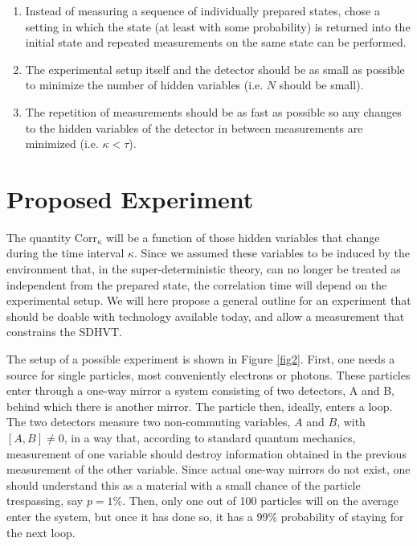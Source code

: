 \documentclass[12pt]{article}                    %
\begin{document}
\begin{enumerate}
\item Instead of measuring a sequence of individually prepared states, chose a setting
in which the state (at least with some probability) is returned into the initial state
and repeated measurements on the same state can be performed. 
\item The experimental setup itself and the detector should be as small as
possible to minimize the number of hidden variables (i.e. $N$ should be small). 
\item The repetition of measurements should be as fast as possible so any
changes to the hidden variables of the detector in between measurements are minimized (i.e. $\kappa < \tau$).
\end{enumerate}

\section{Proposed Experiment}

The quantity ${\mathrm{Corr}}_\kappa$ will be a function of those hidden 
variables that change during the time interval $\kappa$. Since we assumed
these variables to be induced by the environment that, in the super-deterministic
theory, can no longer be treated as independent from the prepared state,
the correlation time will depend on the experimental setup. We will here
propose a general outline for an experiment that should be doable with
technology available today, and allow a measurement that constrains 
the {\sc SDHVT}.

The setup of a possible experiment is shown in Figure \ref{fig2}. First, one
needs a source for single particles, most conveniently electrons or photons. These
particles enter through a one-way mirror a system consisting of two 
detectors, A and B, behind which there is another mirror. The particle
then, ideally, enters a loop. The two detectors 
measure two non-commuting variables, $A$ and $B$, with $[A,B] \neq 0$, in 
a way that, according to standard quantum mechanics, measurement of one variable should 
destroy information obtained in the previous
measurement of the other variable. Since actual one-way mirrors do not exist, one should understand this as 
a material with a small chance of the particle trespassing, say $p=1\%$. Then, only
one out of 100 particles will on the average enter the system, but once it has
done so, it has a 99\% probability of staying for the next loop.


\end{document}
